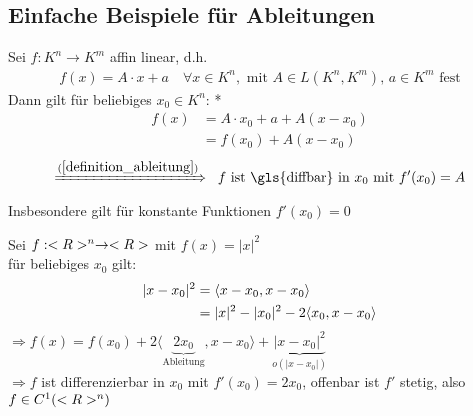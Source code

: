 \subsection{Einfache Beispiele für Ableitungen}
\begin{example}
	Sei $f:K^n\to K^m$ affin linear, d.h. \begin{align*}
		f(x) = A\cdot x + a\quad \forall x\in K^n, \text{ mit } A\in L(K^n, K^m), \, a\in K^m \text{ fest}
	\end{align*}
	Dann gilt für beliebiges $x_0\in K^n$:
	\zeroAmsmathAlignVSpaces**
	\begin{align*}
		f(x) &= A\cdot x_0 + a + A(x - x_0) \\
		&=f(x_0) + A(x - x_0)
	\end{align*}
	\zeroAmsmathAlignVSpaces
	\begin{align*}
		\xRightarrow{(\ref{definition_ableitung})}\;\; \text{$f$ ist  \gls{diffbar} in $x_0$ mit } f'(x_0) = A
	\end{align*}
	Insbesondere gilt für konstante Funktionen $f'(x_0) = 0$
\end{example}

\begin{example}
	Sei $f:<R>^n\to <R>$ mit $f(x)=\vert x\vert^2$ \\
	für beliebiges $x_0$ gilt:
	\begin{align}
		\vert x-x_0\vert^2 &= \langle x-x_0,x-x_0\rangle \notag \\
		&= \vert x\vert^2 - \vert x_0\vert^2 - 2\langle x_0,x-x_0\rangle \notag
	\end{align}
	$\Rightarrow f(x) = f(x_0) + 2\langle \underbrace{2x_0}_{\text{Ableitung}},x-x_0\rangle + \underbrace{\vert x-x_0\vert^2}_{o(\vert x-x_0\vert)}$ \\
	$\Rightarrow f$ ist differenzierbar in $x_0$ mit $f'(x_0)=2x_0$, offenbar ist $f'$ stetig, also $f\in C^1(<R>^n)$
\end{example}

